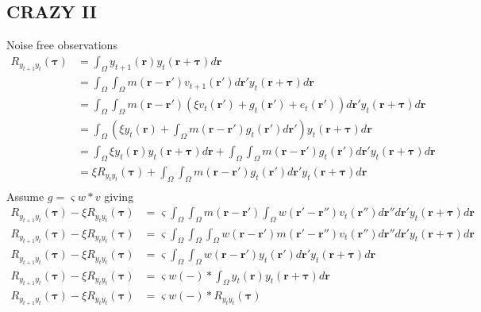 \documentclass[]{article}
\begin{document}
\subsection*{CRAZY II}
Noise free observations
\begin{align}
	R_{y_{t+1}y_t}(\boldsymbol{\tau}) &= \int_{\Omega} y_{t+1}(\mathbf{r}) y_t(\mathbf{r}+\boldsymbol{\tau}) d\mathbf{r} \\
	&= \int_{\Omega}\int_{\Omega} m(\mathbf{r}-\mathbf{r}')v_{t+1}(\mathbf{r}')d\mathbf{r}' y_t(\mathbf{r}+\boldsymbol{\tau}) d\mathbf{r} \\
	&= \int_{\Omega}\int_{\Omega} m(\mathbf{r}-\mathbf{r}')\left(\xi v_t(\mathbf{r}') + g_t(\mathbf{r}') + e_t(\mathbf{r}')\right) d\mathbf{r}' y_t(\mathbf{r}+\boldsymbol{\tau}) d\mathbf{r} \\
	&= \int_{\Omega} \left(\xi y_t(\mathbf{r}) + \int_{\Omega} m(\mathbf{r}-\mathbf{r}') g_t(\mathbf{r}') d\mathbf{r}'\right) y_t(\mathbf{r}+\boldsymbol{\tau}) d\mathbf{r} \\
	&= \int_{\Omega} \xi y_t(\mathbf{r}) y_t(\mathbf{r}+\boldsymbol{\tau}) d\mathbf{r} + \int_{\Omega}\int_{\Omega} m(\mathbf{r}-\mathbf{r}') g_t(\mathbf{r}') d\mathbf{r}' y_t(\mathbf{r}+\boldsymbol{\tau}) d\mathbf{r} \\
	&= \xi R_{y_ty_t}(\boldsymbol{\tau}) + \int_{\Omega}\int_{\Omega} m(\mathbf{r}-\mathbf{r}') g_t(\mathbf{r}') d\mathbf{r}' y_t(\mathbf{r}+\boldsymbol{\tau}) d\mathbf{r} \\
\end{align}
Assume $g = \varsigma w \ast v$ giving
\begin{align}
	R_{y_{t+1}y_t}(\boldsymbol{\tau})-\xi R_{y_ty_t}(\boldsymbol{\tau}) &= \varsigma \int_{\Omega}\int_{\Omega} m(\mathbf{r}-\mathbf{r}') \int_{\Omega} w(\mathbf{r}'-\mathbf{r}'') v_t(\mathbf{r}'')d\mathbf{r}'' d\mathbf{r}' y_t(\mathbf{r}+\boldsymbol{\tau}) d\mathbf{r} \\
	R_{y_{t+1}y_t}(\boldsymbol{\tau})-\xi R_{y_ty_t}(\boldsymbol{\tau}) &= \varsigma \int_{\Omega}\int_{\Omega}\int_{\Omega} w(\mathbf{r}-\mathbf{r}') m(\mathbf{r}'-\mathbf{r}'') v_t(\mathbf{r}'') d\mathbf{r}'' d\mathbf{r}' y_t(\mathbf{r}+\boldsymbol{\tau}) d\mathbf{r} \\
	R_{y_{t+1}y_t}(\boldsymbol{\tau})-\xi R_{y_ty_t}(\boldsymbol{\tau}) &= \varsigma \int_{\Omega}\int_{\Omega} w(\mathbf{r}-\mathbf{r}') y_t(\mathbf{r}') d\mathbf{r}' y_t(\mathbf{r}+\boldsymbol{\tau}) d\mathbf{r} \\
	R_{y_{t+1}y_t}(\boldsymbol{\tau})-\xi R_{y_ty_t}(\boldsymbol{\tau}) &= \varsigma w(-) \ast \int_{\Omega} y_t(\mathbf{r}) y_t(\mathbf{r}+\boldsymbol{\tau}) d\mathbf{r} \\
	R_{y_{t+1}y_t}(\boldsymbol{\tau})-\xi R_{y_ty_t}(\boldsymbol{\tau}) &= \varsigma w(-) \ast R_{y_ty_t}(\boldsymbol{\tau})
\end{align}
\newpage
\end{document}
